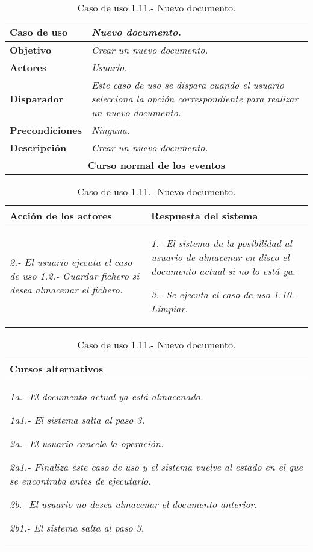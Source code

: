 \documentclass[twoside,a4paper,11pt]{book}
\begin{document}
\begin{table}[!ht]
    \centering
    \begin{tabular}{|p{4cm}|p{11.5cm}|}
    \hline

    \textbf{Caso de uso} & \textit{Nuevo documento.}\\
    \hline

    \textbf{Objetivo} & \textit{Crear un nuevo documento.}\\
    \hline

    \textbf{Actores} & \textit{Usuario.}\\
    \hline

    \textbf{Disparador} & \textit{Este caso de uso se dispara cuando el usuario selecciona la opción correspondiente para realizar un nuevo documento.}\\
    \hline

    \textbf{Precondiciones} & \textit{Ninguna.}\\
    \hline

    \textbf{Descripción} & \textit{Crear un nuevo documento.}\\
    \hline

    \multicolumn{2}{|c|}{\textbf{Curso normal de los eventos}}\\
    \hline

    \end{tabular}
    \begin{tabular}{|p{7.75cm}|p{7.75cm}|}
    \hspace{2cm}\textbf{Acción de los actores} & \hspace{1.75cm}\textbf{Respuesta del sistema}\\
    \hline

    \textit{2.- El usuario ejecuta el caso de uso 1.2.- Guardar fichero si desea almacenar el fichero.}
    &
    \textit{1.- El sistema da la posibilidad al usuario de almacenar en disco el documento actual si no lo está ya.}

    \textit{3.- Se ejecuta el caso de uso 1.10.- Limpiar.}
    \\
    \hline
    \end{tabular}

    \begin{tabular}{|p{15.9cm}|}
      \hspace{6cm}\textbf{Cursos alternativos}\\
      \hline     
	\textit{1a.- El documento actual ya está almacenado.}

	\textit{  1a1.- El sistema salta al paso 3.}

	\textit{2a.- El usuario cancela la operación.}

	\textit{  2a1.- Finaliza éste caso de uso y el sistema vuelve al estado en el que se encontraba antes de ejecutarlo.}

	\textit{2b.- El usuario no desea almacenar el documento anterior.}

	\textit{  2b1.- El sistema salta al paso 3.}
      \\
      \hline
    \end{tabular}
    \caption{Caso de uso 1.11.- Nuevo documento.}
\end{table}
\end{document}
